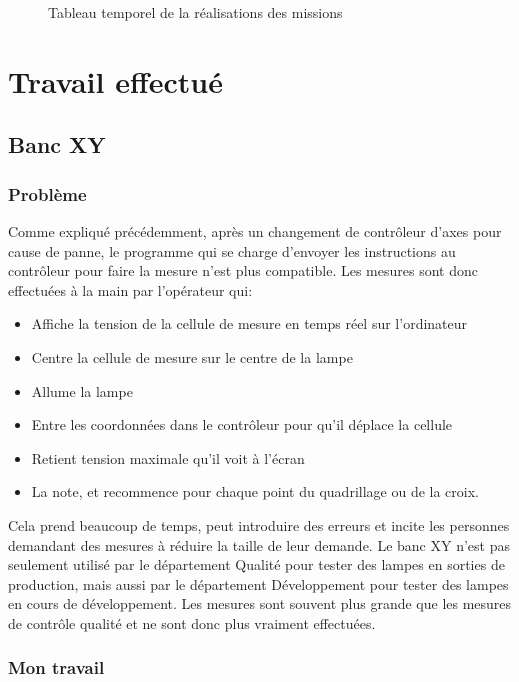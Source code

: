 \documentclass[12pt]{article}
\begin{document}
\begin{figure}[h]
	\centering
	\caption{Tableau temporel de la réalisations des missions}
	\label{fig:planning}
\end{figure}
\newpage

\section{Travail effectué}

\subsection{Banc XY}

\subsubsection{Problème}

Comme expliqué précédemment, après un changement de contrôleur d'axes pour cause de panne, le programme qui se charge d'envoyer les instructions au contrôleur pour faire la mesure n'est plus compatible.
Les mesures sont donc effectuées à la main par l'opérateur qui:
\begin{itemize}
		\label{etapesMesureBancXY}

	\item Affiche la tension de la cellule de mesure en temps réel sur l'ordinateur
	\item Centre la cellule de mesure sur le centre de la lampe
	\item Allume la lampe
	\item Entre les coordonnées dans le contrôleur pour qu'il déplace la cellule
	\item Retient tension maximale qu'il voit à l'écran
	\item La note, et recommence pour chaque point du quadrillage ou de la croix.
\end{itemize}
Cela prend beaucoup de temps, peut introduire des erreurs et incite les personnes demandant des mesures à réduire la taille de leur demande.
Le banc XY n'est pas seulement utilisé par le département Qualité pour tester des lampes en sorties de production, mais aussi par le département Développement pour tester des lampes en cours de développement.
Les mesures sont souvent plus grande que les mesures de contrôle qualité et ne sont donc plus vraiment effectuées.

\subsubsection{Mon travail}
\end{document}
